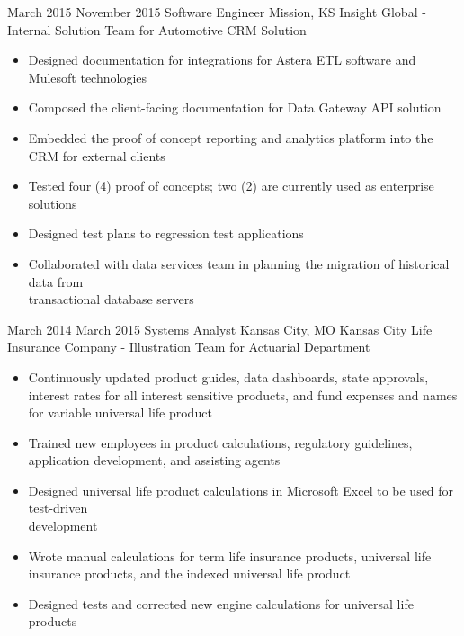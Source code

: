 \Experience
{March 2015}
{November 2015}
{Software Engineer}
{Mission, KS}
{Insight Global - Internal Solution Team for Automotive CRM Solution}
{\begin{itemize}
     \item Designed documentation for integrations for Astera ETL software and Mulesoft
     technologies
     \item Composed the client-facing documentation for Data Gateway API solution
     \item Embedded the proof of concept reporting and analytics platform into the CRM for
     external clients
     \item Tested four (4) proof of concepts; two (2) are currently used as enterprise solutions
     \item Designed test plans to regression test applications
     \item Collaborated with data services team in planning the migration of historical data from
     \\transactional database servers
\end{itemize}}

\vspace*{0.05 in}

\Experience
{March 2014}
{March 2015}
{Systems Analyst}
{Kansas City, MO}
{Kansas City Life Insurance Company - Illustration Team for Actuarial Department}
{\begin{itemize}
    \item Continuously updated product guides, data dashboards, state approvals, interest rates
    for all interest sensitive products, and fund expenses and names for variable universal
    life product
    \item Trained new employees in product calculations, regulatory guidelines, application
    development, and assisting agents
    \item Designed universal life product calculations in Microsoft Excel to be used for
    test-driven \\development
    \item Wrote manual calculations for term life insurance products, universal life insurance
    products, and the indexed universal life product
    \item Designed tests and corrected new engine calculations for universal life products
\end{itemize}}